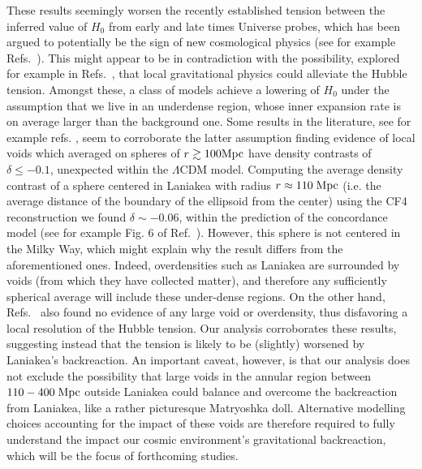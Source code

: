 \documentclass[notitlepage,nofootinbib]{revtex4-1}
\begin{document}
These results seemingly worsen the recently established tension between the inferred value of $H_0$ from early and late times Universe probes, which has been argued to potentially be the sign of new cosmological physics (see for example Refs.~\cite{Vagnozzi:2019ezj,Camarena:2023rsd,Abdalla:2022yfr,Perivolaropoulos:2021jda,DiValentino:2021izs,Hu:2023jqc}). This might appear to be in contradiction with the possibility, explored for example in Refs.~\cite{Hoscheit:2018nfl,Shanks:2018rka,Ding:2019mmw,Cai:2021wgv,Perivolaropoulos:2023tdt,Alestas:2020zol,Perivolaropoulos:2023iqj,Marra:2021fvf,Alestas:2021nmi,Perivolaropoulos:2021bds,Desmond:2020wep}, that local gravitational physics could alleviate the Hubble tension. Amongst these, a class of models achieve a lowering of $H_0$ under the assumption that we live in an underdense region, whose inner expansion rate is on average larger than the background one. Some results in the literature, see for example  refs. \cite{Bohringer:2019tyj,Whitbourn:2013mwa,Tokutake:2017zqf}, seem to corroborate the latter assumption finding evidence of local voids which averaged on spheres of $ r\gtrsim 100 \rm{Mpc}$ have density contrasts of $\delta\leq-0.1$, unexpected within the $\Lambda$CDM model. Computing the average density contrast of a sphere centered in Laniakea with radius $r\approx 110 \;\rm{Mpc}$ (i.e. the average distance of the boundary of the ellipsoid from the center) using the CF4 reconstruction we found $\delta\sim-0.06$, within the prediction of the concordance model (see for example Fig. 6 of Ref.~\cite{Camarena:2022iae}).  However, this sphere is not centered in the Milky Way, which might explain why the result differs from the aforementioned ones. Indeed, overdensities such as Laniakea are surrounded by voids (from which they have collected matter), and therefore any sufficiently spherical average will include these under-dense regions. On the other hand,  Refs.~\cite{Camarena:2022iae,Camarena:2023rsd,Cai:2020tpy} also found no evidence of any large void or overdensity, thus disfavoring a local resolution of the Hubble tension. Our analysis corroborates these results, suggesting instead that the tension is likely to be (slightly) worsened by Laniakea's backreaction.   
An important caveat, however, is that our analysis does not exclude the possibility that large voids in the annular region between $110-400 \;\rm{Mpc}$ outside Laniakea could balance and overcome the backreaction from Laniakea, like a rather picturesque Matryoshka doll. Alternative modelling choices accounting for the impact of these voids are therefore required to fully understand the impact our cosmic environment's gravitational backreaction, which will be the focus of forthcoming studies.   
\end{document}
